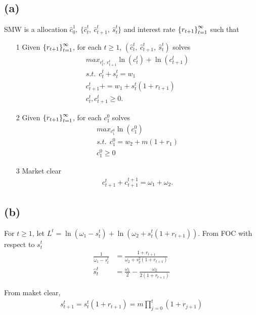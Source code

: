 \documentclass{ltjsarticle}
\begin{document}
\subsection{(a)}
SMW is a allocation $\hat{c}^1_0,\ \{\hat{c}^t_t,\ \hat{c}^t_{t+1},\ \hat{s}^t_t \}$ and interest rate $\qty{r_{t+1}}^{\infty}_{t=1}$ such that
\begin{itemize}
  \item[1] Given $\qty{r_{t+1}}^{\infty}_{t=1}$, for each $t\geq 1$, $(\hat{c}^t_t,\ \hat{c}^t_{t+1},\ \hat{s}^t_t)$ solves\\
\begin{align*}
  max_{{c}^t_t,\ {c}^t_{t+1}} \ln(c^t_t) + \ln(c^t_{t+1})\\
  s.t.\ \ c^t_t + s^t_t = w_1\\
  c^t_{t+1} +  = w_1  + s^t_t(1+r_{t+1})\\
  c^t_t,c^t_{t+1} \geq 0.
\end{align*}
  \item[2]  Given $\qty{r_{t+1}}^{\infty}_{t=1}$, for each  $c^0_1$ solves\\
  \begin{align*}
    max_{c^0_1} \ln(c^0_1) \\
    s.t.\ \ c^0_1  = w_2 + m(1+r_1)\\
    c^0_1\geq 0
  \end{align*}
  \item[3] Market clear\\
   \begin{align*}
    c^t_{t+1} + c^{t+1}_{t+1} =\omega_1+ \omega_2. 
   \end{align*} 
\end{itemize}

\subsection{(b)}
For $t\geq 1$, let $L^t = \ln(\omega_1-s^t_t) + \ln(\omega_2 + s^t_t(1+r_{t+1})) $.
From FOC with respect to $s^t_t$ 
\begin{align*}
  \frac{1}{\omega_1 - s^t_t} &=\frac{1+r_{t+1}}{\omega_2 + s^2_2(1+r_{t+1})}\\
  \hat{s}^t_t &= \frac{\omega_1}{2} - \frac{\omega_2}{2(1+r_{t+1})}
\end{align*}

From maket clear, 
\begin{align*}
  s^t_{t+1} = s^t_t (1+r_{t+1}) = m \prod^{t}_{j=0}(1+r_{j+1})
\end{align*}
\end{document}
